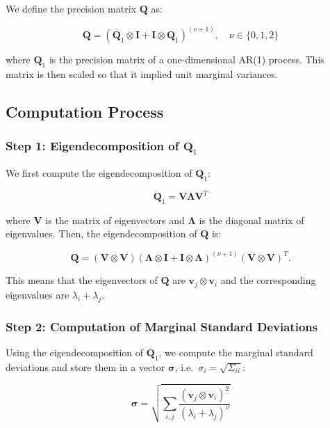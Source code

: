 \documentclass[journal=,manuscript=]{achemso}
\begin{document}
We define the precision matrix \(\mathbf{Q}\) as:

\[
\mathbf{Q} = (\mathbf{Q}_1 \otimes \mathbf{I} + \mathbf{I} \otimes \mathbf{Q}_1)^{(\nu + 1)}, \quad \nu \in \{0, 1, 2\}
\]

where \(\mathbf{Q}_1\) is the precision matrix of a one-dimensional
AR(1) process. This matrix is then scaled so that it implied unit
marginal variances.

\subsection{Computation Process}\label{computation-process}

\subsubsection{\texorpdfstring{Step 1: Eigendecomposition of
\(\mathbf{Q}_1\)}{Step 1: Eigendecomposition of \textbackslash mathbf\{Q\}\_1}}\label{step-1-eigendecomposition-of-mathbfq_1}

We first compute the eigendecomposition of \(\mathbf{Q}_1\):

\[
\mathbf{Q}_1 = \mathbf{V}\mathbf{\Lambda}\mathbf{V}^T
\]

where \(\mathbf{V}\) is the matrix of eigenvectors and
\(\mathbf{\Lambda}\) is the diagonal matrix of eigenvalues. Then, the
eigendecomposition of \(\mathbf{Q}\) is:

\[
\mathbf{Q} = (\mathbf{V} \otimes \mathbf{V})(\mathbf{\Lambda} \otimes \mathbf{I} + \mathbf{I} \otimes \mathbf{\Lambda})^{(\nu + 1)}(\mathbf{V} \otimes \mathbf{V})^T.
\]

This means that the eigenvectors of \(\mathbf{Q}\) are
\(\mathbf{v}_j \otimes \mathbf{v}_i\) and the corresponding eigenvalues
are \(\lambda_i + \lambda_j\).

\subsubsection{Step 2: Computation of Marginal Standard
Deviations}\label{step-2-computation-of-marginal-standard-deviations}

Using the eigendecomposition of \(\mathbf{Q}_1\), we compute the
marginal standard deviations and store them in a vector
\(\mathbf{\sigma}\), i.e.~\(\sigma_i = \sqrt{\Sigma_{ii}}\):

\[
\mathbf{\sigma} = \sqrt{\sum_{i,j} \frac{(\mathbf{v}_j \otimes \mathbf{v}_i)^2}{(\lambda_i + \lambda_j)^\nu}}
\]
\end{document}
